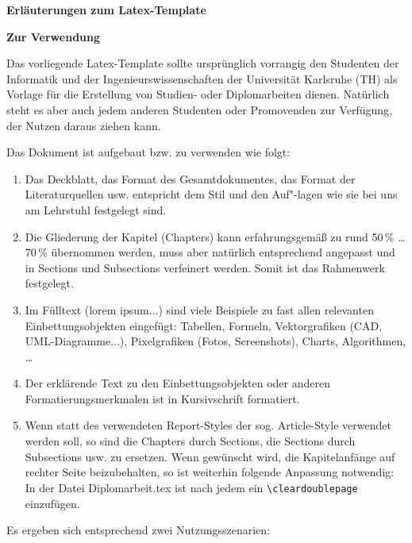 \color{darkred}


\textbf{\Large{Erläuterungen zum Latex-Template}}


\medskip
\medskip
\medskip

\textbf{Zur Verwendung}

Das vorliegende Latex-Template sollte ursprünglich vorrangig den Studenten der Informatik und der Ingenieurswissenschaften der Universität Karlsruhe (TH) als Vorlage für die Erstellung von Studien- oder Diplomarbeiten dienen. Natürlich steht es aber auch jedem anderen Studenten oder Promovenden zur Verfügung, der Nutzen daraus ziehen kann.

\medskip
\medskip
\medskip


Das Dokument ist aufgebaut bzw. zu verwenden wie folgt:
\begin{enumerate}
\item Das Deckblatt, das Format des Gesamtdokumentes, das Format der Literaturquellen usw. entspricht dem Stil und den Auf"-lagen wie sie bei uns am Lehrstuhl festgelegt sind.
\item Die Gliederung der Kapitel (Chapters) kann erfahrungsgemäß zu rund 50\,\% \dots 70\,\% übernommen werden, muss aber natürlich entsprechend angepasst und in Sections und Subsections verfeinert werden. Somit ist das Rahmenwerk festgelegt.
\item Im Fülltext (lorem ipsum...) sind viele Beispiele zu fast allen relevanten Einbettungsobjekten eingefügt: Tabellen, Formeln, Vektorgrafiken (CAD, UML-Diagramme...), Pixelgrafiken (Fotos, Screenshots), Charts, Algorithmen, \dots
\item Der erklärende Text zu den Einbettungsobjekten oder anderen Formatierungsmerkmalen ist in Kursivschrift formatiert.
\item Wenn statt des verwendeten Report-Styles der sog. Article-Style verwendet werden soll, so sind die Chapters durch Sections, die Sections durch Subsections usw. zu ersetzen. Wenn gewünscht wird, die Kapitelanfänge auf rechter Seite beizubehalten, so ist weiterhin folgende Anpassung notwendig: In der Datei Diplomarbeit.tex ist nach jedem \verb$$ ein \verb$\cleardoublepage$ einzufügen.
\end{enumerate}

\medskip
\medskip
\medskip


Es ergeben sich entsprechend zwei Nutzungsszenarien:

